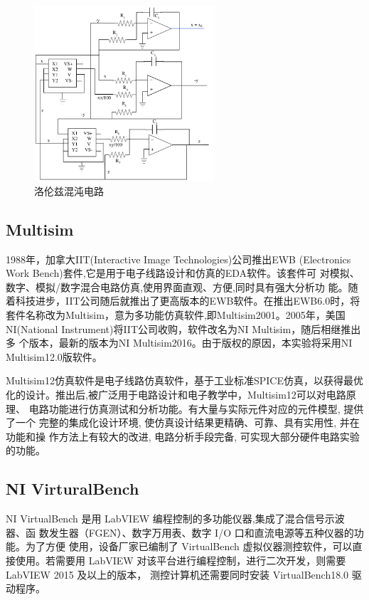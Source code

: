 \documentclass[10pt,a4paper,twoside,UTF8]{ctexart}
\begin{document}
\begin{figure}[H]
	\centering
	\includegraphics[width=0.6\textwidth]{fig//The-Lorenz-chaotic-circuit.png}
	\caption{洛伦兹混沌电路}
	\label{fig:lorenz_circuit}
\end{figure}




\subsection{Multisim}
1988年，加拿大IIT(Interactive Image Technologies)公司推出EWB 
(Electronics Work Bench)套件,它是用于电子线路设计和仿真的EDA软件。该套件可
对模拟、数字、模拟/数字混合电路仿真,使用界面直观、方便,同时具有强大分析功
能。随着科技进步，IIT公司随后就推出了更高版本的EWB软件。在推出EWB6.0时，将
套件名称改为Multisim，意为多功能仿真软件,即Multisim2001。2005年，美国
NI(National Instrument)将IIT公司收购，软件改名为NI Multisim，随后相继推出多
个版本，最新的版本为NI Multisim2016。由于版权的原因，本实验将采用NI 
Multisim12.0版软件。

Multisim12仿真软件是电子线路仿真软件，基于工业标准SPICE仿真，以获得最优
化的设计。推出后,被广泛用于电路设计和电子教学中，Multisim12可以对电路原理、
电路功能进行仿真测试和分析功能。有大量与实际元件对应的元件模型, 提供了一个
完整的集成化设计环境, 使仿真设计结果更精确、可靠、具有实用性, 并在功能和操
作方法上有较大的改进, 电路分析手段完备, 可实现大部分硬件电路实验的功能。

\subsection{NI VirturalBench}
NI VirtualBench 是用 LabVIEW 编程控制的多功能仪器,集成了混合信号示波器、函
数发生器（FGEN）、数字万用表、数字 I/O 口和直流电源等五种仪器的功能。为了方便
使用，设备厂家已编制了 VirtualBench 虚拟仪器测控软件，可以直接使用。若需要用
LabVIEW 对该平台进行编程控制，进行二次开发，则需要 LabVIEW 2015 及以上的版本，
测控计算机还需要同时安装 VirtualBench18.0 驱动程序。
\end{document}
